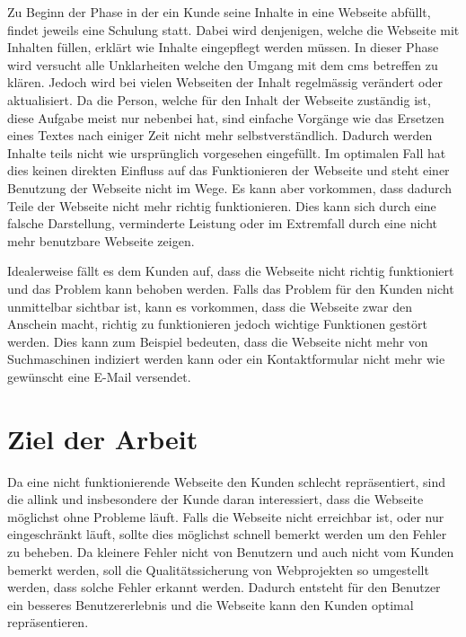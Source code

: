 Zu Beginn der Phase in der ein Kunde seine Inhalte in eine Webseite abfüllt, findet jeweils eine Schulung statt. Dabei wird denjenigen, welche die Webseite mit Inhalten füllen, erklärt wie Inhalte eingepflegt werden müssen. In dieser Phase wird versucht alle Unklarheiten welche den Umgang mit dem \acrshort{cms}  betreffen zu klären. Jedoch wird bei vielen Webseiten der Inhalt regelmässig verändert oder aktualisiert. Da die Person, welche für den Inhalt der Webseite zuständig ist, diese Aufgabe meist nur nebenbei hat, sind einfache Vorgänge wie das Ersetzen eines Textes nach einiger Zeit nicht mehr selbstverständlich. Dadurch werden Inhalte teils nicht wie ursprünglich vorgesehen eingefüllt. Im optimalen Fall hat dies keinen direkten Einfluss auf das Funktionieren der Webseite und steht einer Benutzung der Webseite nicht im Wege. Es kann aber vorkommen, dass dadurch Teile der Webseite nicht mehr richtig funktionieren. Dies kann sich durch eine falsche Darstellung, verminderte Leistung oder im Extremfall durch eine nicht mehr benutzbare Webseite zeigen.

Idealerweise fällt es dem Kunden auf, dass die Webseite nicht richtig funktioniert und das Problem kann behoben werden. Falls das Problem für den Kunden nicht unmittelbar sichtbar ist, kann es vorkommen, dass die Webseite zwar den Anschein macht, richtig zu funktionieren jedoch wichtige Funktionen gestört werden. Dies kann zum Beispiel bedeuten, dass die Webseite nicht mehr von Suchmaschinen indiziert werden kann oder ein Kontaktformular nicht mehr wie gewünscht eine E-Mail versendet.

\section{Ziel der Arbeit}
\label{sec:ziel_der_arbeit}
Da eine nicht funktionierende Webseite den Kunden schlecht repräsentiert, sind die allink und insbesondere der Kunde daran interessiert, dass die Webseite möglichst ohne Probleme läuft. Falls die Webseite nicht erreichbar ist, oder nur eingeschränkt läuft, sollte dies möglichst schnell bemerkt werden um den Fehler zu beheben. Da kleinere Fehler nicht von Benutzern und auch nicht vom Kunden bemerkt werden, soll die Qualitätssicherung von Webprojekten so umgestellt werden, dass solche Fehler erkannt werden. Dadurch entsteht für den Benutzer ein besseres Benutzererlebnis und die Webseite kann den Kunden optimal repräsentieren.
